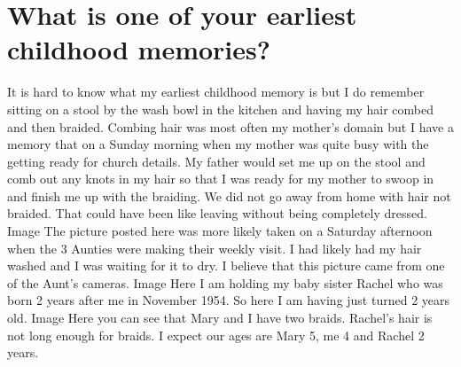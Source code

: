 \section{What is one of your earliest childhood memories?}
It is hard to know what my earliest childhood memory is but I do remember sitting on a stool by the wash bowl in the kitchen and having my hair combed and then braided.
Combing hair was most often my mother's domain but I have a memory that on a Sunday morning when my mother was quite busy with the getting ready for church details.
My father would set me up on the stool and comb out any knots in my hair so that I was ready for my mother to swoop in and finish me up with the braiding.
We did not go away from home with hair not braided.
That could have been like leaving without being completely dressed.
Image
The picture posted here was more likely taken on a Saturday afternoon when the 3 Aunties were making their weekly visit.
I had likely had my hair washed and I was waiting for it to dry.
I believe that this picture came from one of the Aunt's cameras.
Image
Here I am holding my baby sister Rachel who was born 2 years after me in November 1954.
So here I am having just turned 2 years old.
Image
Here you can see that Mary and I have two braids.
Rachel's hair is not long enough for braids.
I expect our ages are Mary 5, me 4 and Rachel 2 years.
